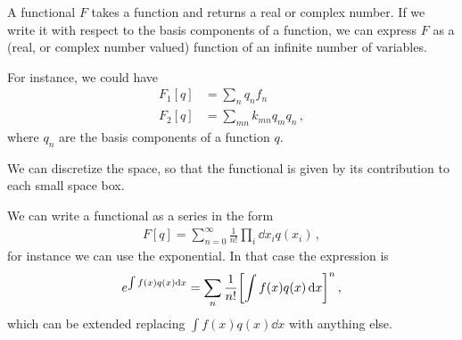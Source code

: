 \documentclass[main.tex]{subfiles}
\begin{document}
A functional \(F\) takes a function and returns a real or complex number. If we write it with respect to the basis components of a function, we can express \(F\) as a (real, or complex number valued) function of an infinite number of variables. 

For instance, we could have 
%
\begin{align}
F_1 [q] &= \sum _{n} q_n f_n  \\
F_2 [q] &= \sum _{mn} k_{mn} q_m q_n
\,,
\end{align}
%
where \(q_n\) are the basis components of a function \(q\). 

We can discretize the space, so that the functional is given by its contribution to each small space box. 

We can write a functional as a series in the form 
%
\begin{align}
F[q] = \sum _{n=0}^{ \infty } \frac{1}{n!} \prod_i \dd{x_{i}} q(x_i)
\,,
\end{align}
%
for instance we can use the exponential. In that case the expression is 
%
\begin{align}
e^{\int f(x)q(x) \dd{x}}
= \sum _{n} \frac{1}{n!} \qty[\int f(x) q(x) \dd{x}]^{n}
\,,
\end{align}
%
which can be extended replacing \(\int f(x) q(x) \dd{x}\) with anything else. 
\end{document}
